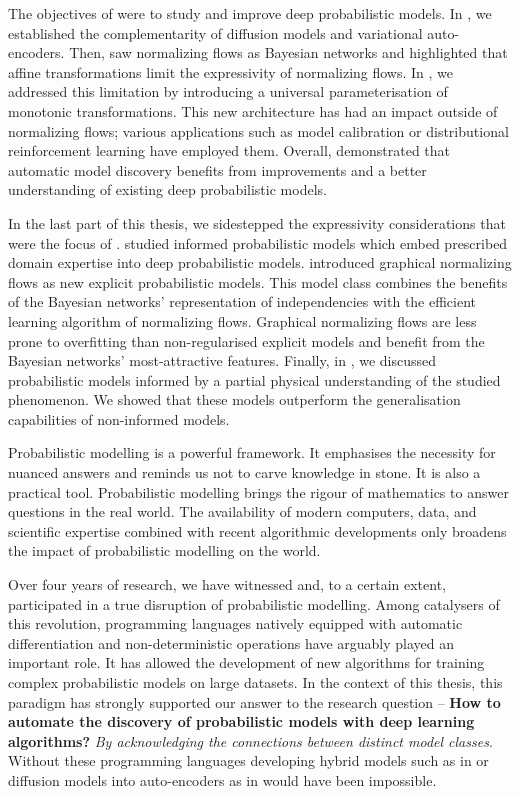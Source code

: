 The objectives of  were to study and improve deep probabilistic models. In , we established the complementarity of diffusion models and variational auto-encoders. Then,  saw normalizing flows as Bayesian networks and highlighted that affine transformations limit the expressivity of normalizing flows. In , we addressed this limitation by introducing a universal parameterisation of monotonic transformations. This new architecture has had an impact outside of normalizing flows; various applications such as model calibration or distributional reinforcement learning have employed them. Overall,  demonstrated that automatic model discovery benefits from improvements and a better understanding of existing deep probabilistic models.

In the last part of this thesis, we sidestepped the expressivity considerations that were the focus of .   studied informed probabilistic models which embed prescribed domain expertise into deep probabilistic models.  introduced graphical normalizing flows as new explicit probabilistic models. This model class combines the benefits of the Bayesian networks' representation of independencies with the efficient learning algorithm of normalizing flows. Graphical normalizing flows are less prone to overfitting than non-regularised explicit models and benefit from the Bayesian networks' most-attractive features. Finally, in , we discussed probabilistic models informed by a partial physical understanding of the studied phenomenon. We showed that these models outperform the generalisation capabilities of non-informed models. %

Probabilistic modelling is a powerful framework. It emphasises the necessity for nuanced answers and reminds us not to carve knowledge in stone. It is also a practical tool. Probabilistic modelling brings the rigour of mathematics to answer questions in the real world. The availability of modern computers, data, and scientific expertise combined with recent algorithmic developments only broadens the impact of probabilistic modelling on the world.

Over four years of research, we have witnessed and, to a certain extent, participated in a true disruption of probabilistic modelling. Among catalysers of this revolution, programming languages natively equipped with automatic differentiation and non-deterministic operations have arguably played an important role. It has allowed the development of new algorithms for training complex probabilistic models on large datasets. In the context of this thesis, this paradigm has strongly supported our answer to the research question -- \textbf{How to automate the discovery of probabilistic models with deep learning algorithms?} \textit{By acknowledging the connections between distinct model classes}. Without these programming languages developing hybrid models such as in  or diffusion models into auto-encoders as in  would have been impossible.

